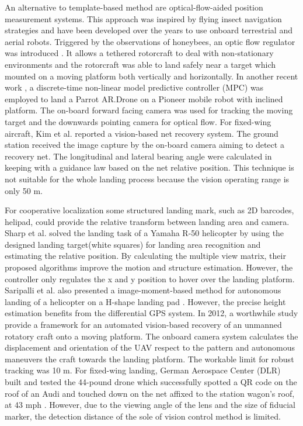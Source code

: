 An alternative to template-based method are optical-flow-aided position measurement systems. This approach was inspired by flying insect navigation strategies \cite{Green2004} and have been developed over the years to use onboard terrestrial and aerial robots. Triggered by the observations of honeybees, an optic flow regulator was introduced \cite{Ruffier2014}. It allows a tethered rotorcraft to deal with non-stationary environments and the rotorcraft was able to land safely near a target which mounted on a moving platform both vertically and horizontally. In another recent work \cite{Vlantis2015}, a discrete-time non-linear model predictive controller (MPC) was employed to land a Parrot AR.Drone on a Pioneer mobile robot with inclined platform. The on-board forward facing camera was used for tracking the moving target and the downwards pointing camera for optical flow. For fixed-wing aircraft, Kim et al.\cite{Kim2013} reported a vision-based net recovery system. The ground station received the image capture by the on-board camera aiming to detect a recovery net. The longitudinal and lateral bearing angle were calculated in keeping with a guidance law based on the net relative position. This technique is not suitable for the whole landing process because the vision operating range is only 50 m.
 


For cooperative localization some structured landing mark, such as 2D barcodes, helipad, could provide the relative transform between landing area and camera. Sharp et al. \cite{Sharp2001} solved the landing task of a Yamaha R-50 helicopter by using the designed landing target(white squares) for landing area recognition and estimating the relative position. By calculating the multiple view matrix, their proposed algorithms\cite{Shakernia2002} improve the motion and structure estimation. However, the controller only regulates the x and y position to hover over the landing platform. Saripalli et al. also presented a image-moment-based method for autonomous landing of a helicopter on a H-shape landing pad \cite{Saripalli2003}. However, the precise height estimation benefits from the differential GPS system. In 2012, a worthwhile study \cite{richardsonautomated2013} provide a framework for an automated vision-based recovery of an unmanned rotatory craft onto a moving platform. The onboard camera system calculates the displacement and orientation of the UAV respect to the pattern and autonomous maneuvers the craft towards the landing platform. The workable limit for robust tracking was 10 m. For fixed-wing landing, German Aerospace Center (DLR) built and tested the 44-pound drone which successfully spotted a QR code on the roof of an Audi and touched down on the net affixed to the station wagon’s roof, at 43 mph \cite{DLR_Landing}. However, due to the viewing angle of the lens and the size of fiducial marker, the detection distance of the sole of vision control method is limited.



